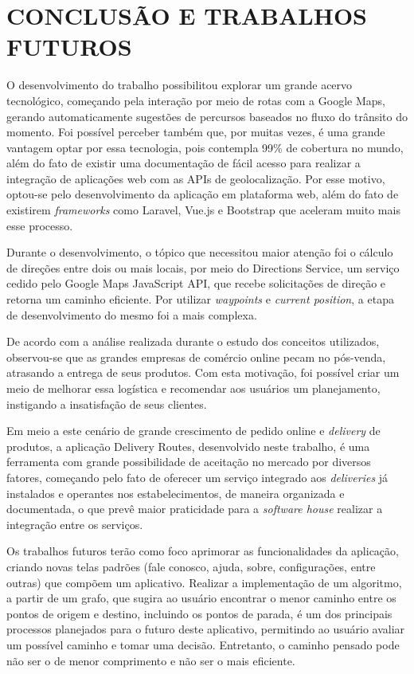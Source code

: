 
\chapter{CONCLUSÃO E TRABALHOS FUTUROS}
O desenvolvimento do trabalho possibilitou explorar um grande acervo tecnológico, começando pela interação por meio de rotas com a Google Maps, gerando automaticamente sugestões de percursos baseados no fluxo do trânsito do momento. Foi possível perceber também que, por muitas vezes, é uma grande vantagem optar por essa tecnologia, pois contempla 99\% de cobertura no mundo, além do fato de existir uma documentação de fácil acesso para realizar a integração de aplicações web com as APIs de geolocalização. Por esse motivo, optou-se pelo desenvolvimento da aplicação em plataforma web, além do fato de existirem \textit{frameworks} como Laravel, Vue.js e Bootstrap que aceleram muito mais esse processo.

Durante o desenvolvimento, o tópico que necessitou maior atenção foi o cálculo de direções entre dois ou mais locais, por meio do Directions Service, um serviço cedido pelo Google Maps JavaScript API, que recebe solicitações de direção e retorna um caminho eficiente. Por utilizar \textit{waypoints} e \textit{current position}, a etapa de desenvolvimento do mesmo foi a mais complexa.

De acordo com a análise realizada durante o estudo dos conceitos utilizados, observou-se que as grandes empresas de comércio online pecam no pós-venda, atrasando a entrega de seus produtos. Com esta motivação, foi possível criar um meio de melhorar essa logística e recomendar aos usuários um planejamento, instigando a insatisfação de seus clientes.

Em meio a este cenário de grande crescimento de pedido online e \textit{delivery} de produtos, a aplicação Delivery Routes, desenvolvido neste trabalho, é uma ferramenta com grande possibilidade de aceitação no mercado por diversos fatores, começando pelo fato de oferecer um serviço integrado aos \textit{deliveries} já instalados e operantes nos estabelecimentos, de maneira organizada e documentada, o que prevê maior praticidade para a \textit{software house} realizar a integração entre os serviços.


Os trabalhos futuros terão como foco aprimorar as funcionalidades da aplicação, criando novas telas padrões (fale conosco, ajuda, sobre, configurações, entre outras) que compõem um aplicativo. 
Realizar a implementação de um algoritmo, a partir de um grafo, que sugira ao usuário encontrar o menor caminho entre os pontos de origem e destino, incluindo os pontos de parada, é um dos principais processos planejados para o futuro deste aplicativo, permitindo ao usuário avaliar um possível caminho e tomar uma decisão. Entretanto, o caminho pensado pode não ser o de menor comprimento e não ser o mais eficiente.

